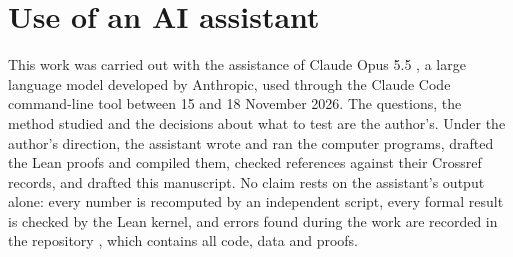 \documentclass[11pt]{amsart}
\theoremstyle{remark}
\begin{document}
\section*{Use of an AI assistant}
This work was carried out with the assistance of Claude Opus 5.5 \cite{Claude}, a large language model developed by Anthropic, used through the Claude Code command-line tool between 15 and 18 November 2026. The questions, the method studied and the decisions about what to test are the author's. Under the author's direction, the assistant wrote and ran the computer programs, drafted the Lean proofs and compiled them, checked references against their Crossref records, and drafted this manuscript. No claim rests on the assistant's output alone: every number is recomputed by an independent script, every formal result is checked by the Lean kernel, and errors found during the work are recorded in the repository \cite{Repo}, which contains all code, data and proofs.



\end{document}
